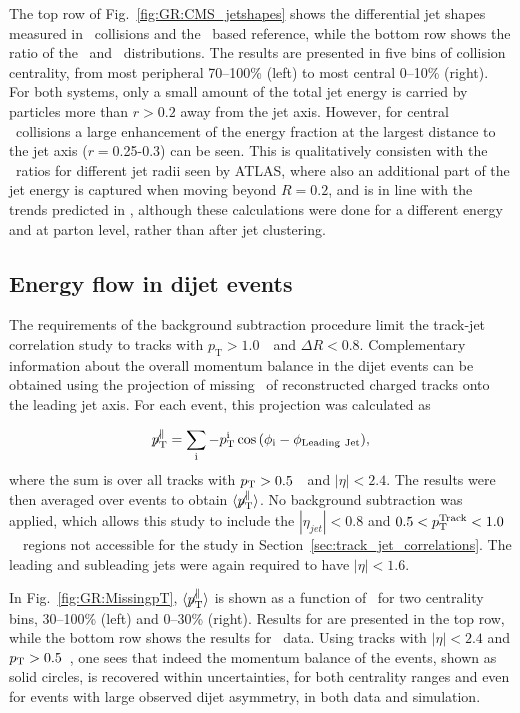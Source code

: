 The top row of Fig.~\ref{fig:GR:CMS_jetshapes} shows the differential jet shapes measured in \PbPb\ 
collisions and the \pp\ based reference, while the bottom row shows the ratio of the \PbPb\ and \pp\ 
distributions. The results are presented in five bins of collision centrality, from
most peripheral 70--100\% (left) to most central 0--10\% (right). For 
both systems, only a small amount of the total jet energy 
is carried by particles more than  $r> 0.2$ away from the jet axis. However, for central 
\PbPb\ collisions a large enhancement of the energy fraction at the largest distance
to the jet axis ($r = $0.25-0.3) can be seen.
This is qualitatively consisten with the \Rcp\ ratios for different jet radii seen by ATLAS, 
where also an additional part of the jet energy is captured when moving beyond $R = 0.2$, and is 
in line with the trends predicted in \cite{Vitev,Renk:2009hv}, although these calculations were
done for a different energy and at parton level, rather than after jet clustering.

\subsection{Energy flow in dijet events}

The requirements of the background subtraction procedure limit the track-jet correlation study
to tracks with $p_{\mathrm{T}} > 1.0$~\GeVc\  and $\Delta R < 0.8$. Complementary information about the
overall momentum balance in the dijet events can be obtained using the projection of missing
\pt\ of reconstructed charged tracks onto the leading jet axis. For each event, this
projection was calculated as

\begin{equation}
\displaystyle{\not} p_{\mathrm{T}}^{\parallel} =
\sum_{\rm i}{ -p_{\mathrm{T}}^{\rm i}\cos{(\phi_{\rm i}-\phi_{\rm Leading\ Jet})}},
\end{equation}
where the sum is over all tracks with $p_{\rm{T}} > 0.5$~\GeVc\ and $|\eta| < 2.4$. The results were
then averaged over events to obtain $\langle \displaystyle{\not} p_{\mathrm{T}}^{\parallel} \rangle$.
No background subtraction was applied, which allows this study to include the $|\eta_{jet}| < 0.8$ and 
$0.5 < p_{\mathrm{T}}^{\rm Track} < 1.0$~\GeVc\ regions not accessible for the study in Section~\ref{sec:track_jet_correlations}.
The leading and subleading jets were again required to have $|\eta| < 1.6$.

In Fig.~\ref{fig:GR:MissingpT}, $\langle \displaystyle{\not} p_{\mathrm{T}}^{\parallel} \rangle$
is shown as a function of \AJ\ for two centrality bins, 30--100\% (left) and 0--30\% (right).
Results for {\sc{pythia+hydjet}} are presented in the top row, while the bottom row shows the results
for \PbPb\ data.
Using tracks with $|\eta| < 2.4$ and $p_{\rm{T}} > 0.5$~\GeVc, one sees
that indeed the momentum balance of the events, shown as solid circles, is recovered within uncertainties,
for both centrality ranges and even for events with large observed dijet asymmetry, in both data and simulation.

